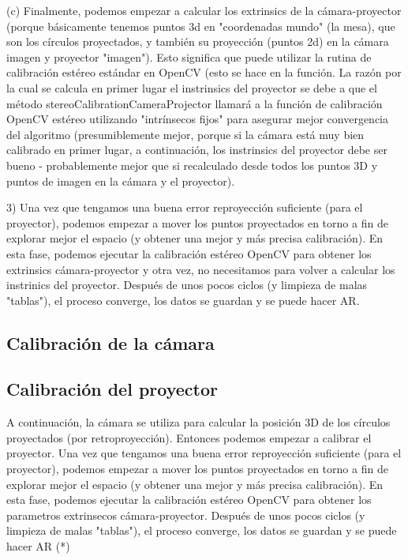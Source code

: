 (c) Finalmente, podemos empezar a calcular los extrinsics de la cámara-proyector (porque básicamente tenemos puntos 3d en "coordenadas mundo" (la mesa), que son los círculos proyectados, y también su proyección (puntos 2d) en la cámara imagen y proyector "imagen"). Esto significa que puede utilizar la rutina de calibración estéreo estándar en OpenCV (esto se hace en la función. La razón por la cual se calcula en primer lugar el instrinsics del proyector se debe a que el método stereoCalibrationCameraProjector llamará a la función de calibración OpenCV estéreo utilizando "intrínsecos fijos" para asegurar mejor convergencia del algoritmo (presumiblemente mejor, porque si la cámara está muy bien calibrado en primer lugar, a continuación, los instrinsics del proyector debe ser bueno - probablemente mejor que si recalculado desde todos los puntos 3D y puntos de imagen en la cámara y el proyector). 

3) Una vez que tengamos una buena error reproyección suficiente (para el proyector), podemos empezar a mover los puntos proyectados en torno a fin de explorar mejor el espacio (y obtener una mejor y más precisa calibración). En esta fase, podemos ejecutar la calibración estéreo OpenCV para obtener los extrinsics cámara-proyector y otra vez, no necesitamos para volver a calcular los instrinics del proyector. Después de unos pocos ciclos (y limpieza de malas "tablas"), el proceso converge, los datos se guardan y se puede hacer AR. 





\subsection{Calibración de la cámara}

\subsection{Calibración del proyector}

A continuación, la cámara se utiliza para calcular la posición 3D de los círculos proyectados (por retroproyección). Entonces podemos empezar a calibrar el proyector. Una vez que tengamos una buena error reproyección suficiente (para el proyector), podemos empezar a mover los puntos proyectados en torno a fin de explorar mejor el espacio (y obtener una mejor y más precisa calibración). En esta fase, podemos ejecutar la calibración estéreo OpenCV para obtener los parametros extrinsecos cámara-proyector. Después de unos pocos ciclos (y limpieza de malas "tablas"), el proceso converge, los datos se guardan y se puede hacer AR (*) 

